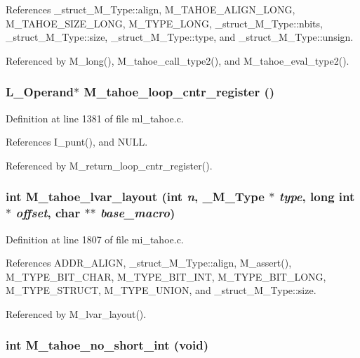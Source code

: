 References \_\-struct\_\-M\_\-Type::align, M\_\-TAHOE\_\-ALIGN\_\-LONG, M\_\-TAHOE\_\-SIZE\_\-LONG, M\_\-TYPE\_\-LONG, \_\-struct\_\-M\_\-Type::nbits, \_\-struct\_\-M\_\-Type::size, \_\-struct\_\-M\_\-Type::type, and \_\-struct\_\-M\_\-Type::unsign.

Referenced by M\_\-long(), M\_\-tahoe\_\-call\_\-type2(), and M\_\-tahoe\_\-eval\_\-type2().
\subsubsection{\setlength{\rightskip}{0pt plus 5cm}L\_\-Operand$\ast$ M\_\-tahoe\_\-loop\_\-cntr\_\-register ()}\label{m__tahoe_8h_995bf451818848ba6a77c36985d49bba}




Definition at line 1381 of file ml\_\-tahoe.c.

References I\_\-punt(), and NULL.

Referenced by M\_\-return\_\-loop\_\-cntr\_\-register().
\subsubsection{\setlength{\rightskip}{0pt plus 5cm}int M\_\-tahoe\_\-lvar\_\-layout (int {\em n}, \bf{\_\-M\_\-Type} $\ast$ {\em type}, long int $\ast$ {\em offset}, char $\ast$$\ast$ {\em base\_\-macro})}\label{m__tahoe_8h_83c5ea1a62433d6e2994b47ce9678e3f}




Definition at line 1807 of file mi\_\-tahoe.c.

References ADDR\_\-ALIGN, \_\-struct\_\-M\_\-Type::align, M\_\-assert(), M\_\-TYPE\_\-BIT\_\-CHAR, M\_\-TYPE\_\-BIT\_\-INT, M\_\-TYPE\_\-BIT\_\-LONG, M\_\-TYPE\_\-STRUCT, M\_\-TYPE\_\-UNION, and \_\-struct\_\-M\_\-Type::size.

Referenced by M\_\-lvar\_\-layout().
\subsubsection{\setlength{\rightskip}{0pt plus 5cm}int M\_\-tahoe\_\-no\_\-short\_\-int (void)}\label{m__tahoe_8h_bae6101c8131e2457900459863c3a0be}




